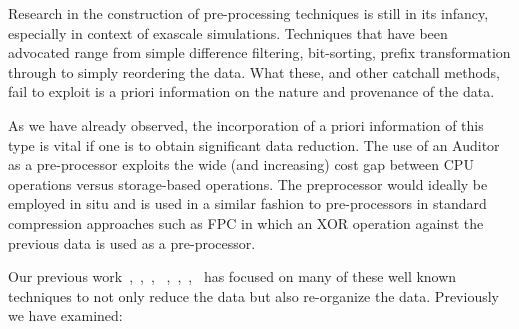 Research in the construction of pre-processing techniques is still in its
infancy, especially in context of exascale simulations. Techniques that have
been advocated range from simple difference filtering, bit-sorting, prefix
transformation through to simply reordering the data.  What these, and other
catchall methods, fail to exploit is a priori information on the nature and
provenance of the data.

As we have already observed, the incorporation of a priori information of this
type is vital if one is to obtain significant data reduction. The use of an
Auditor as a pre-processor exploits the wide (and increasing) cost gap between
CPU operations versus storage-based operations. The preprocessor would ideally
be employed in situ and is used in a similar fashion to pre-processors in
standard compression approaches such as FPC \cite{BurtscherFPC} in which an XOR
operation against the previous data is used as a pre-processor.

Our previous work~\cite{lakshminarasimhan2011compressing},~\cite{lakshminarasimhan2011compressing},~\cite{gong2012multi},
~\cite{jenkins2012byte},~\cite{gong2013parlo},~\cite{boyuka2014transparent},~\cite{tang2014improving} has focused on many
of these well known techniques to not only reduce the data but also re-organize the data. Previously we have examined:


